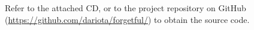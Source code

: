 Refer to the attached CD, or to the project repository on GitHub (\url{https://github.com/dariota/forgetful/}) to obtain the source code.
